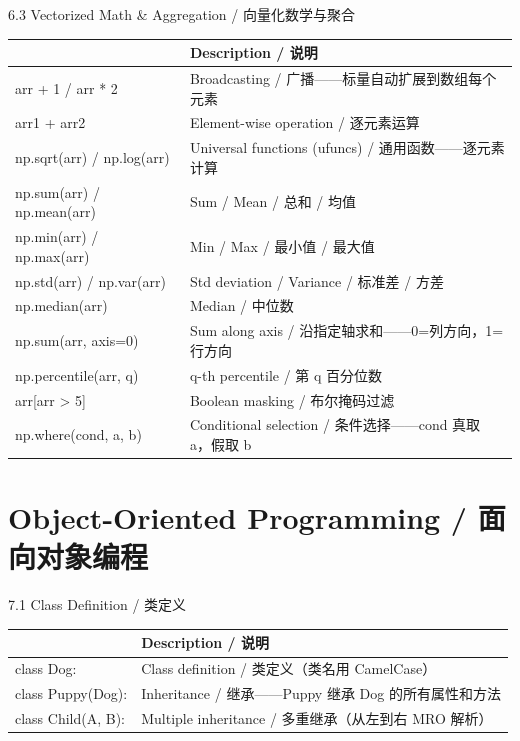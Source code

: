 \documentclass[11pt,a4paper]{report}
\begin{document}
\begin{cmdsection}{6.3  Vectorized Math \& Aggregation / 向量化数学与聚合}
\normalsize\renewcommand{\arraystretch}{1.4}
\centering
\begin{tabularx}{\textwidth}{@{}>{\ttfamily}l>{\raggedright\arraybackslash}X@{}}
\toprule
\multicolumn{1}{@{}l}{\textbf{Syntax}} & \textbf{Description / 说明} \\ \midrule
arr + 1 / arr * 2           & Broadcasting / 广播——标量自动扩展到数组每个元素 \\
arr1 + arr2                 & Element-wise operation / 逐元素运算 \\
np.sqrt(arr) / np.log(arr)  & Universal functions (ufuncs) / 通用函数——逐元素计算 \\
np.sum(arr) / np.mean(arr)  & Sum / Mean / 总和 / 均值 \\
np.min(arr) / np.max(arr)   & Min / Max / 最小值 / 最大值 \\
np.std(arr) / np.var(arr)   & Std deviation / Variance / 标准差 / 方差 \\
np.median(arr)              & Median / 中位数 \\
np.sum(arr, axis=0)         & Sum along axis / 沿指定轴求和——0=列方向，1=行方向 \\
np.percentile(arr, q)       & q-th percentile / 第 q 百分位数 \\
arr[arr > 5]                & Boolean masking / 布尔掩码过滤 \\
np.where(cond, a, b)        & Conditional selection / 条件选择——cond 真取 a，假取 b \\
\bottomrule
\end{tabularx}
\end{cmdsection}

\newpage

\chapter{Object-Oriented Programming / 面向对象编程}

\begin{cmdsection}{7.1  Class Definition / 类定义}
\normalsize\renewcommand{\arraystretch}{1.4}
\centering
\begin{tabularx}{\textwidth}{@{}>{\ttfamily}l>{\raggedright\arraybackslash}X@{}}
\toprule
\multicolumn{1}{@{}l}{\textbf{Syntax}} & \textbf{Description / 说明} \\ \midrule
class Dog:                  & Class definition / 类定义（类名用 CamelCase） \\
class Puppy(Dog):           & Inheritance / 继承——Puppy 继承 Dog 的所有属性和方法 \\
class Child(A, B):          & Multiple inheritance / 多重继承（从左到右 MRO 解析） \\
\bottomrule
\end{tabularx}
\end{cmdsection}
\end{document}
